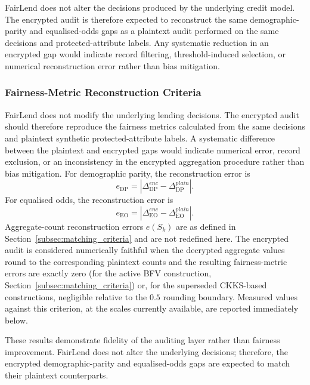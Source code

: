 \documentclass[a4paper,fleqn]{cas-dc}
\begin{document}
FairLend does not alter the decisions produced by the underlying credit model. The encrypted audit is therefore expected to reconstruct the same demographic-parity and equalised-odds gaps as a plaintext audit performed on the same decisions and protected-attribute labels. Any systematic reduction in an encrypted gap would indicate record filtering, threshold-induced selection, or numerical reconstruction error rather than bias mitigation.

\subsubsection{Fairness-Metric Reconstruction Criteria} \label{subsec:fairness_reconstruction} FairLend does not modify the underlying lending decisions. The encrypted audit should therefore reproduce the fairness metrics calculated from the same decisions and plaintext synthetic protected-attribute labels. A systematic difference between the plaintext and encrypted gaps would indicate numerical error, record exclusion, or an inconsistency in the encrypted aggregation procedure rather than bias mitigation. For demographic parity, the reconstruction error is \[ e_{\mathrm{DP}} = \left| \Delta_{\mathrm{DP}}^{enc} - \Delta_{\mathrm{DP}}^{plain} \right|. \] For equalised odds, the reconstruction error is \[ e_{\mathrm{EO}} = \left| \Delta_{\mathrm{EO}}^{enc} - \Delta_{\mathrm{EO}}^{plain} \right|. \] Aggregate-count reconstruction errors $e(S_k)$ are as defined in Section~\ref{subsec:matching_criteria} and are not redefined here. The encrypted audit is considered numerically faithful when the decrypted aggregate values round to the corresponding plaintext counts and the resulting fairness-metric errors are exactly zero (for the active BFV construction, Section~\ref{subsec:matching_criteria}) or, for the superseded CKKS-based constructions, negligible relative to the $0.5$ rounding boundary. Measured values against this criterion, at the scales currently available, are reported immediately below.


These results demonstrate fidelity of the auditing layer rather than fairness improvement. FairLend does not alter the underlying decisions; therefore, the encrypted demographic-parity and equalised-odds gaps are expected to match their plaintext counterparts.
\end{document}

